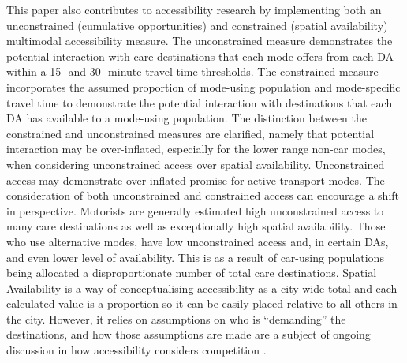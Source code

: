 \documentclass[
  authoryear,
  preprint,
  3p]{elsarticle}
\begin{document}
This paper also contributes to accessibility research by implementing
both an unconstrained (cumulative opportunities) and constrained
(spatial availability) multimodal accessibility measure. The
unconstrained measure demonstrates the potential interaction with care
destinations that each mode offers from each DA within a 15- and 30-
minute travel time thresholds. The constrained measure incorporates the
assumed proportion of mode-using population and mode-specific travel
time to demonstrate the potential interaction with destinations that
each DA has available to a mode-using population. The distinction
between the constrained and unconstrained measures are clarified, namely
that potential interaction may be over-inflated, especially for the
lower range non-car modes, when considering unconstrained access over
spatial availability. Unconstrained access may demonstrate over-inflated
promise for active transport modes. The consideration of both
unconstrained and constrained access can encourage a shift in
perspective. Motorists are generally estimated high unconstrained access
to many care destinations as well as exceptionally high spatial
availability. Those who use alternative modes, have low unconstrained
access and, in certain DAs, and even lower level of availability. This
is as a result of car-using populations being allocated a
disproportionate number of total care destinations. Spatial Availability
is a way of conceptualising accessibility as a city-wide total and each
calculated value is a proportion so it can be easily placed relative to
all others in the city. However, it relies on assumptions on who is
``demanding'' the destinations, and how those assumptions are made are a
subject of ongoing discussion in how accessibility considers competition
\citep{merlinDoesCompetitionMatter2017, kelobonyeMeasuringAccessibilitySpatial2020}.
\end{document}
